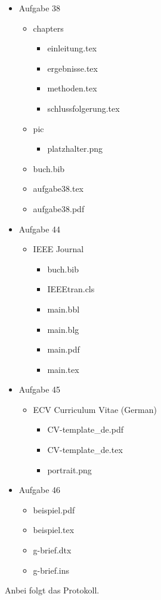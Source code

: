 \documentclass[11pt,ngerman,latin9]{g-brief}
\begin{document}
\begin{g-brief}
\begin{itemize}
 \item Aufgabe 38
 \begin{itemize}
  \item chapters
  \begin{itemize}
   \item einleitung.tex
   \item ergebnisse.tex
   \item methoden.tex
   \item schlussfolgerung.tex
  \end{itemize}

  \item pic
  \begin{itemize}
   \item platzhalter.png
  \end{itemize}

  \item buch.bib
  \item aufgabe38.tex
  \item aufgabe38.pdf
 \end{itemize}
 
 \pagebreak
 \item Aufgabe 44
 \begin{itemize}
  \item IEEE Journal
  \begin{itemize}
   \item buch.bib
   \item IEEEtran.cls
   \item main.bbl
   \item main.blg
   \item main.pdf
   \item main.tex
  \end{itemize}
 \end{itemize}

 \item Aufgabe 45
 \begin{itemize}
  \item ECV Curriculum Vitae (German)
  \begin{itemize}
   \item CV-template\_de.pdf
   \item CV-template\_de.tex
   \item portrait.png
  \end{itemize}
 \end{itemize}

 \item Aufgabe 46
 \begin{itemize}
  \item beispiel.pdf
  \item beispiel.tex
  \item g-brief.dtx
  \item g-brief.ins
 \end{itemize}
\end{itemize}

Anbei folgt das Protokoll.

\end{g-brief}
\end{document}
